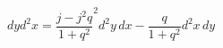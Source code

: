 \begin{equation}
dyd^{2}x=\frac{j-j^{2}q}{1+q^{2}}^{2}d^{2}y\, dx-\frac{q}{1+q^{2}}d^{2}x%
\, dy
\end{equation}

